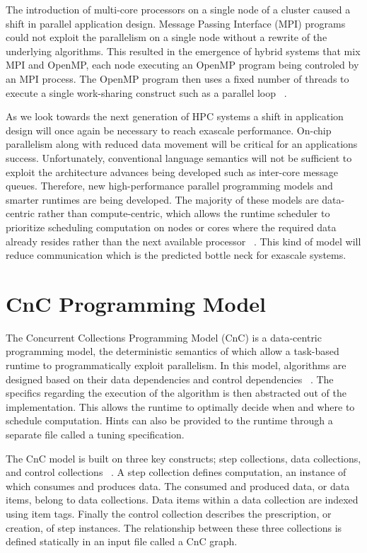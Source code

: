 \documentclass{vgtc}                          %
\begin{document}
The introduction of multi-core processors on a single node of a cluster caused a shift in parallel application design.  Message Passing Interface (MPI) programs could not exploit the parallelism on a single node without a rewrite of the underlying algorithms.  This resulted in the emergence of hybrid systems that mix MPI and OpenMP, each node executing an OpenMP program being controled by an MPI process.  The OpenMP program then uses a fixed number of threads to execute a single work-sharing construct such as a parallel loop ~\cite{gropp2013programming}.

As we look towards the next generation of HPC systems a shift in application design will once again be necessary to reach exascale performance.  On-chip parallelism along with reduced data movement will be critical for an applications success.  Unfortunately, conventional language semantics will not be sufficient to exploit the architecture advances being developed such as inter-core message queues.  Therefore, new high-performance parallel programming models and smarter runtimes are being developed.  The majority of these models are data-centric rather than compute-centric, which allows the runtime scheduler to prioritize scheduling computation on nodes or cores where the required data already resides rather than the next available processor ~\cite{kogge2013exascale}.  This kind of model will reduce communication which is the predicted bottle neck for exascale systems.

\section{CnC Programming Model}

The Concurrent Collections Programming Model (CnC) is a data-centric programming model, the deterministic semantics of which allow a task-based runtime to programmatically exploit parallelism.  In this model, algorithms are designed based on their data dependencies and control dependencies ~\cite{budimlicconcurrent}.  The specifics regarding the execution of the algorithm is then abstracted out of the implementation.  This allows the runtime to optimally decide when and where to schedule computation.  Hints can also be provided to the runtime through a separate file called a tuning specification.  

The CnC model is built on three key constructs; step collections, data collections, and control collections ~\cite{budimlicconcurrent}.  A step collection defines computation, an instance of which consumes and produces data.  The consumed and produced data, or data items, belong to data collections.  Data items within a data collection are indexed using item tags.  Finally the control collection describes the prescription, or creation, of step instances.  The relationship between these three collections is defined statically in an input file called a CnC graph.
\end{document}
